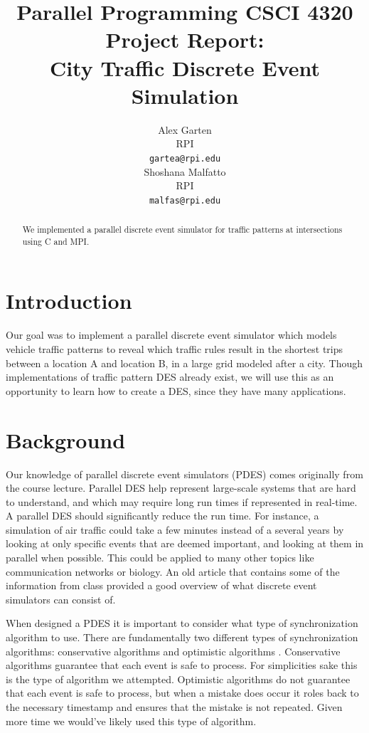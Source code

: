 \documentclass[10pt,a4paper]{article}
\title{Parallel Programming CSCI 4320 Project Report: \\
City Traffic Discrete Event Simulation}
\author{Alex Garten \\
  RPI \\
  \texttt{gartea@rpi.edu} \\\And
  Shoshana Malfatto \\
  RPI \\
  \texttt{malfas@rpi.edu} \\}
\date{}
\begin{document}
\maketitle
\begin{abstract}
    We implemented a parallel discrete event simulator for traffic patterns at intersections using C and MPI.
\end{abstract}

\section{Introduction}

Our goal was to implement a parallel discrete event simulator which models vehicle traffic patterns to reveal which traffic rules result in the shortest trips between a location A and location B, in a large grid modeled after a city. Though implementations of traffic pattern DES already exist, we will use this as an opportunity to learn how to create a DES, since they have many applications.

\section{Background}
Our knowledge of parallel discrete event simulators (PDES) comes originally from the course lecture. Parallel DES help represent large-scale systems that are hard to understand, and which may require long run times if represented in real-time. A parallel DES should significantly reduce the run time. For instance, a simulation of air traffic could take a few minutes instead of a several years by looking at only specific events that are deemed important, and looking at them in parallel when possible. This could be applied to many other topics like communication networks or biology. An old article \cite{Fujimoto:1990:PDE:84537.84545} that contains some of the information from class provided a good overview of what discrete event simulators can consist of.

When designed a PDES it is important to consider what type of synchronization algorithm to use. There are fundamentally two different types of synchronization algorithms: conservative algorithms and optimistic algorithms \cite{Fujimoto:1993:PDD:256563.256596}. Conservative algorithms guarantee that each event is safe to process. For simplicities sake this is the type of algorithm we attempted. Optimistic algorithms do not guarantee that each event is safe to process, but when a mistake does occur it roles back to the necessary timestamp and ensures that the mistake is not repeated. Given more time we would've likely used this type of algorithm.
\end{document}
